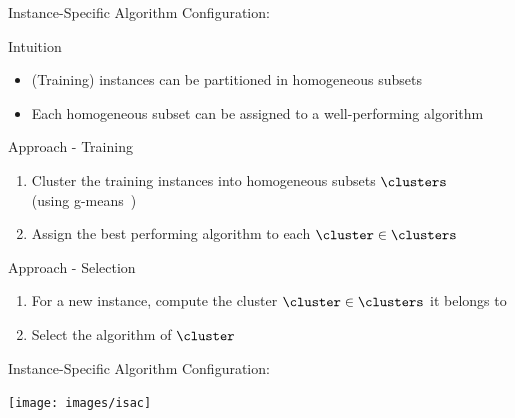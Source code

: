 \begin{frame}[c]{Instance-Specific Algorithm Configuration: \isac{}\\ }

\begin{block}{Intuition}
\begin{itemize}
  \item (Training) instances can be partitioned in homogeneous subsets
  \item Each homogeneous subset can be assigned to a well-performing algorithm
\end{itemize}
\end{block}

\pause

\begin{block}{Approach - Training}
\begin{enumerate}
  \item Cluster the training instances into homogeneous subsets $\clusters$ \\ (using g-means~)
  \item Assign the best performing algorithm to each $\cluster \in \clusters$ 
\end{enumerate}
\end{block}

\pause

\begin{block}{Approach - Selection}
\begin{enumerate}
  \item For a new instance, compute the cluster $\cluster \in \clusters$ it belongs to
  \item Select the algorithm of $\cluster$
\end{enumerate}
\end{block}

\end{frame}
\begin{frame}[c]{Instance-Specific Algorithm Configuration: \isac{}\\ }

\texttt{[image: images/isac]}

\end{frame}

